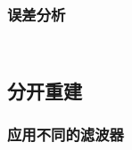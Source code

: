 \documentclass[12pt,aspectratio=169]{beamer} %
\begin{document}
\begin{frame}
    \frametitle{误差分析}
    \begin{columns}
        \begin{column}{0.7\textwidth}
            \begin{figure}
                \qquad
            \end{figure}
        \end{column}
    \end{columns}
    

\end{frame}

\subsection{分开重建}

\begin{frame}
    \frametitle{应用不同的滤波器}

    

\end{frame}
\end{document}
